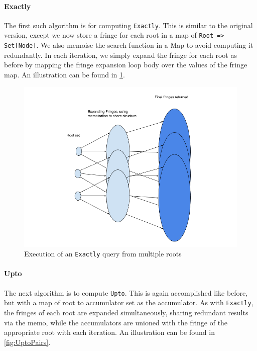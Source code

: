 \documentclass[12pt,a4paper,twoside,openright]{report}
\newcommand\codeName[1]{\texttt{#1}}
\begin{document}
		\paragraph{Exactly}
The first such algorithm is for computing \codeName{Exactly}. This is similar to the original version, except we now store a fringe for each root in a map of \codeName{Root => Set[Node]}. We also memoise the search function in a Map to avoid computing it redundantly. In each iteration, we simply expand the fringe for each root as before by mapping the fringe expansion loop body over the values of the fringe map. An illustration can be found in \ref{fig:ExactlyPairs}.

\begin{figure}[ht]
\centering
  \includegraphics[width=\textwidth]{figs/ExactlyPairs.png}
  \caption{Execution of an \codeName{Exactly} query from multiple roots}
  \label{fig:ExactlyPairs}
\end{figure}
		
		\paragraph{Upto}
The next algorithm is to compute \codeName{Upto}. This is again accomplished like before, but with a map of root to accumulator set as the accumulator. As with \codeName{Exactly}, the fringes of each root are expanded simultaneously, sharing redundant results via the memo, while the accumulators are unioned with the fringe of the appropriate root with each iteration. An illustration can be found in \ref{fig:UptoPairs}.
\end{document}
